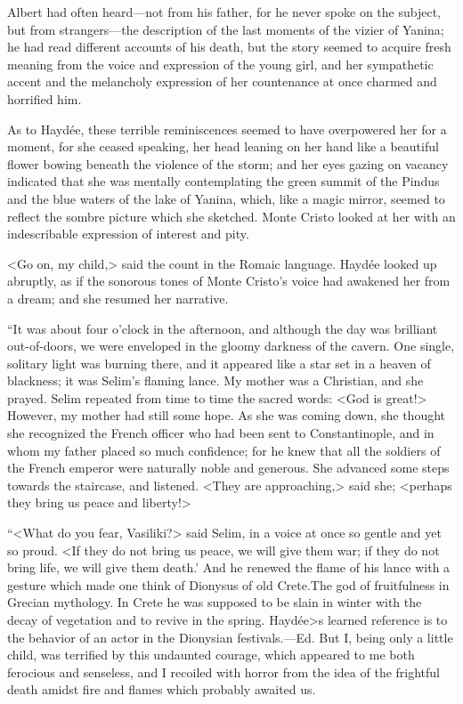  Albert had often heard—not from his father, for he never spoke on the subject, but from strangers—the description of the last moments of the vizier of Yanina; he had read different accounts of his death, but the story seemed to acquire fresh meaning from the voice and expression of the young girl, and her sympathetic accent and the melancholy expression of her countenance at once charmed and horrified him. 

 As to Haydée, these terrible reminiscences seemed to have overpowered her for a moment, for she ceased speaking, her head leaning on her hand like a beautiful flower bowing beneath the violence of the storm; and her eyes gazing on vacancy indicated that she was mentally contemplating the green summit of the Pindus and the blue waters of the lake of Yanina, which, like a magic mirror, seemed to reflect the sombre picture which she sketched. Monte Cristo looked at her with an indescribable expression of interest and pity. 

 <Go on, my child,> said the count in the Romaic language.  Haydée looked up abruptly, as if the sonorous tones of Monte Cristo's voice had awakened her from a dream; and she resumed her narrative. 

 “It was about four o'clock in the afternoon, and although the day was brilliant out-of-doors, we were enveloped in the gloomy darkness of the cavern. One single, solitary light was burning there, and it appeared like a star set in a heaven of blackness; it was Selim's flaming lance. My mother was a Christian, and she prayed. Selim repeated from time to time the sacred words: <God is great!> However, my mother had still some hope. As she was coming down, she thought she recognized the French officer who had been sent to Constantinople, and in whom my father placed so much confidence; for he knew that all the soldiers of the French emperor were naturally noble and generous. She advanced some steps towards the staircase, and listened. <They are approaching,> said she; <perhaps they bring us peace and liberty!> 

 “<What do you fear, Vasiliki?> said Selim, in a voice at once so gentle and yet so proud. <If they do not bring us peace, we will give them war; if they do not bring life, we will give them death.' And he renewed the flame of his lance with a gesture which made one think of Dionysus of old Crete.The god of fruitfulness in Grecian mythology. In Crete he was supposed to be slain in winter with the decay of vegetation and to revive in the spring. Haydée>s learned reference is to the behavior of an actor in the Dionysian festivals.—Ed. But I, being only a little child, was terrified by this undaunted courage, which appeared to me both ferocious and senseless, and I recoiled with horror from the idea of the frightful death amidst fire and flames which probably awaited us. 

